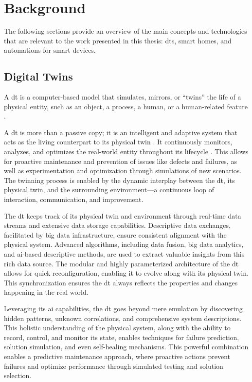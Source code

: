\chapter{Background}\label{ch:background}

The following sections provide an overview of the main concepts and technologies that are relevant to the work presented in this thesis: \acrshort{dt}s, smart homes, and automations for smart devices.

\section{Digital Twins}

A \acrfull{dt} is a computer-based model that simulates, mirrors, or ``twins'' the life of a physical entity, such as an object, a process, a human, or a human-related feature \parencite{barricelliMultiModalApproachCreating2022}.

A \acrshort{dt} is more than a passive copy; it is an intelligent and adaptive system that acts as the living counterpart to its physical twin \parencite{grievesDigitalTwinManufacturing2014,kritzingerDigitalTwinManufacturing2018}. It continuously  monitors, analyzes, and optimizes the real-world entity throughout its lifecycle \parencite{negriReviewRolesDigital2017}. This allows for proactive maintenance and prevention of issues like defects and failures, as well as experimentation and optimization through simulations of new scenarios. The twinning process is enabled by the dynamic interplay between the \acrshort{dt}, its physical twin, and the surrounding environment---a continuous loop of interaction, communication, and improvement.

The \acrshort{dt} keeps track of its physical twin and environment through real-time data streams and extensive data storage capabilities. Descriptive data exchanges, facilitated by big data infrastructure, ensure consistent alignment with the physical system. Advanced algorithms, including data fusion, big data analytics, and \acrshort{ai}-based descriptive methods, are used to extract valuable insights from this rich data source. The modular and highly parameterized architecture of the \acrshort{dt} allows for quick reconfiguration, enabling it to evolve along with its physical twin. This synchronization ensures the \acrshort{dt} always reflects the properties and changes happening in the real world.

Leveraging its \acrshort{ai} capabilities, the \acrshort{dt} goes beyond mere emulation by discovering hidden patterns, unknown correlations, and comprehensive system descriptions. This holistic understanding of the physical system, along with the ability to record, control, and monitor its state, enables techniques for failure prediction, solution simulation, and even self-healing mechanisms. This powerful combination enables a predictive maintenance approach, where proactive actions prevent failures and optimize performance through simulated testing and solution selection.

